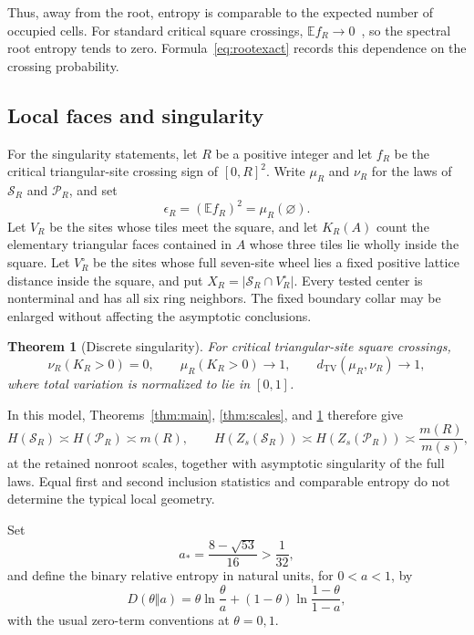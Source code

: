 \documentclass[11pt]{amsart}
\newtheorem{theorem}{Theorem}[section]
\theoremstyle{remark}
\newcommand{\E}{\mathbb E}
\newcommand{\cS}{\mathcal S}
\newcommand{\cP}{\mathcal P}
\newcommand{\TV}{d_{\mathrm{TV}}}
\newcommand{\astar}{a_*}
\begin{document}
Thus, away from the root, entropy is comparable to the expected number
of occupied cells. For standard critical square crossings,
$\E f_R\to0$~\cite[Section~1.3]{GPS}, so the spectral root entropy tends
to zero. Formula~\eqref{eq:rootexact} records this dependence on the
crossing probability.

\subsection{Local faces and singularity}

For the singularity statements, let $R$ be a positive integer and let $f_R$ be the critical triangular-site crossing sign of $[0,R]^2$. Write $\mu_R$ and $\nu_R$ for the laws of $\cS_R$ and $\cP_R$, and set
\[
 \epsilon_R=(\E f_R)^2=\mu_R(\varnothing).
\]
Let $V_R$ be the sites whose tiles meet the square, and let $K_R(A)$ count the elementary triangular faces contained in $A$ whose three tiles lie wholly inside the square. Let $V_R^\circ$ be the sites whose full seven-site wheel lies a fixed positive lattice distance inside the square, and put $X_R=|\cS_R\cap V_R^\circ|$. Every tested center is nonterminal and has all six ring neighbors. The fixed boundary collar may be enlarged without affecting the asymptotic conclusions.

\begin{theorem}[Discrete singularity]\label{thm:discrete}
For critical triangular-site square crossings,
\[
 \nu_R(K_R>0)=0,\qquad \mu_R(K_R>0)\longrightarrow1,
 \qquad \TV(\mu_R,\nu_R)\longrightarrow1,
\]
where total variation is normalized to lie in $[0,1]$.
\end{theorem}

In this model, Theorems~\ref{thm:main}, \ref{thm:scales}, and \ref{thm:discrete} therefore give
\[
 H(\cS_R)\asymp H(\cP_R)\asymp m(R),\qquad
 H(Z_s(\cS_R))\asymp H(Z_s(\cP_R))\asymp\frac{m(R)}{m(s)},
\]
at the retained nonroot scales, together with asymptotic singularity of the full laws. Equal first and second inclusion statistics and comparable entropy do not determine the typical local geometry.

Set
\begin{equation}\label{eq:astar}
 \astar=\frac{8-\sqrt{53}}{16}>\frac1{32},
\end{equation}
and define the binary relative entropy in natural units, for $0<a<1$, by
\[
 D(\theta\Vert a)=\theta\ln\frac{\theta}{a}
 +(1-\theta)\ln\frac{1-\theta}{1-a},
\]
with the usual zero-term conventions at $\theta=0,1$.
\end{document}
